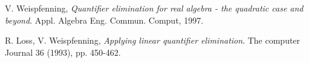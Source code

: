 \begin{thebibliography}{9}
V. Weispfenning,
\textit{Quantifier elimination for real algebra - the quadratic case and beyond}.
Appl. Algebra Eng. Commun. Comput, 1997.
 
R. Loss, V. Weispfenning,
\textit{Applying linear quantifier elimination}.
The computer Journal 36 (1993), pp. 450-462.
\end{thebibliography}